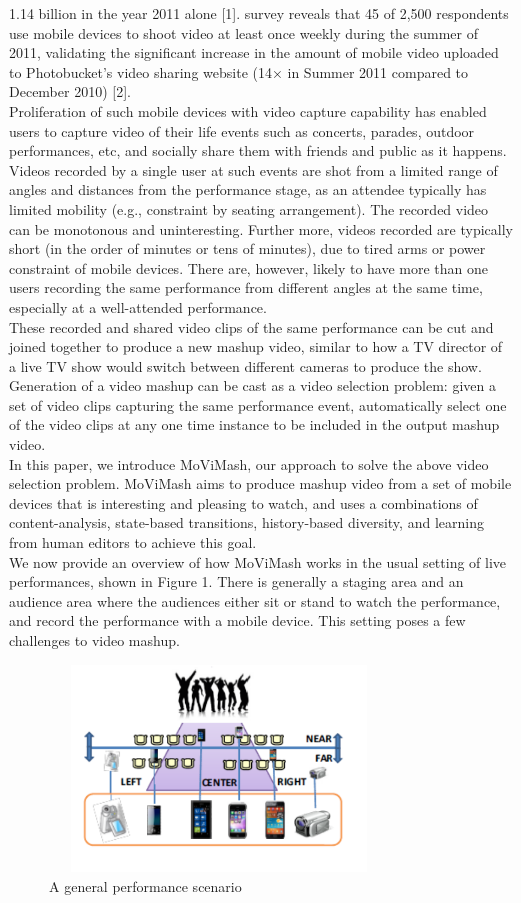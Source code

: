 \documentclass{sig-alternate}
\begin{document}
1.14 billion in the year 2011 alone [1]. survey reveals that 45%
of 2,500 respondents  use mobile devices to shoot video at least once weekly
during the summer of 2011, validating the significant increase in
the amount of mobile video uploaded to Photobucket’s video sharing website (14× in Summer 2011 compared to December 2010) [2].\\
Proliferation of such mobile devices with video capture capability has enabled users to capture video of their life events such
as concerts, parades, outdoor performances, etc, and socially share
them with friends and public as it happens. Videos recorded by
a single user at such events are shot from a limited range of angles and distances from the performance stage, as an attendee typically has limited mobility (e.g., constraint by seating arrangement).
The recorded video can be monotonous and uninteresting. Further more, videos recorded are typically short (in the order of minutes
or tens of minutes), due to tired arms or power constraint of mobile
devices. There are, however, likely to have more than one users
recording the same performance from different angles at the same
time, especially at a well-attended performance.\\
These recorded and shared video clips of the same performance
can be cut and joined together to produce a new mashup video,
similar to how a TV director of a live TV show would switch between different cameras to produce the show. Generation of a video
mashup can be cast as a video selection problem: given a set of
video clips capturing the same performance event, automatically
select one of the video clips at any one time instance to be included
in the output mashup video.\\
In this paper, we introduce MoViMash, our approach to solve
the above video selection problem. MoViMash aims to produce
mashup video from a set of mobile devices that is interesting and
pleasing to watch, and uses a combinations of content-analysis,
state-based transitions, history-based diversity, and learning from
human editors to achieve this goal.\\
We now provide an overview of how MoViMash works in the
usual setting of live performances, shown in Figure 1. There is
generally a staging area and an audience area where the audiences
either sit or stand to watch the performance, and record the performance with a mobile device. This setting poses a few challenges to
video mashup.\\
\begin{figure}[h!]
  
  \includegraphics[width=9cm, height=5.5cm]{video_5.pdf}
\caption{A general performance scenario}
\end{figure}
\end{document}
